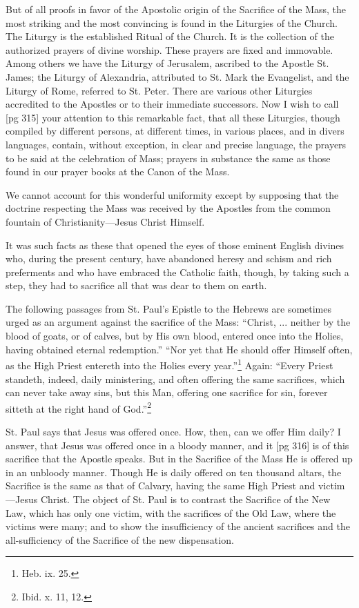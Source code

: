 But of all proofs in favor of the Apostolic origin
of the Sacrifice of the Mass, the most striking and
the most convincing is found in the Liturgies of
the Church. The Liturgy is the established Ritual
of the Church. It is the collection of the authorized
prayers of divine worship. These prayers
are fixed and immovable. Among others we have
the Liturgy of Jerusalem, ascribed to the Apostle
St. James; the Liturgy of Alexandria, attributed
to St. Mark the Evangelist, and the Liturgy of
Rome, referred to St. Peter. There are various
other Liturgies accredited to the Apostles or to
their immediate successors. Now I wish to call
[pg 315]
your attention to this remarkable fact, that all
these Liturgies, though compiled by different persons,
at different times, in various places, and in
divers languages, contain, without exception, in
clear and precise language, the prayers to be said
at the celebration of Mass; prayers in substance
the same as those found in our prayer books at the
Canon of the Mass.

We cannot account for this wonderful uniformity
except by supposing that the doctrine respecting
the Mass was received by the Apostles from
the common fountain of Christianity—Jesus
Christ Himself.

It was such facts as these that opened the eyes
of those eminent English divines who, during the
present century, have abandoned heresy and
schism and rich preferments and who have embraced
the Catholic faith, though, by taking such a
step, they had to sacrifice all that was dear to
them on earth.

The following passages from St. Paul's Epistle
to the Hebrews are sometimes urged as an argument
against the sacrifice of the Mass: “Christ, ...
neither by the blood of goats, or of calves,
but by His own blood, entered once into the Holies,
having obtained eternal redemption.” “Nor yet
that He should offer Himself often, as the High
Priest entereth into the Holies every year.”\footnote{Heb. ix. 25.}
Again: “Every Priest standeth, indeed, daily
ministering, and often offering the same sacrifices,
which can never take away sins, but this Man, offering
one sacrifice for sin, forever sitteth at the
right hand of God.”\footnote{Ibid. x. 11, 12.}

St. Paul says that Jesus was offered once. How,
then, can we offer Him daily? I answer, that
Jesus was offered once in a bloody manner, and it
[pg 316]
is of this sacrifice that the Apostle speaks. But
in the Sacrifice of the Mass He is offered up in an
unbloody manner. Though He is daily offered on
ten thousand altars, the Sacrifice is the same as
that of Calvary, having the same High Priest and
victim—Jesus Christ. The object of St. Paul is
to contrast the Sacrifice of the New Law, which
has only one victim, with the sacrifices of the Old
Law, where the victims were many; and to show
the insufficiency of the ancient sacrifices and the
all-sufficiency of the Sacrifice of the new dispensation.

